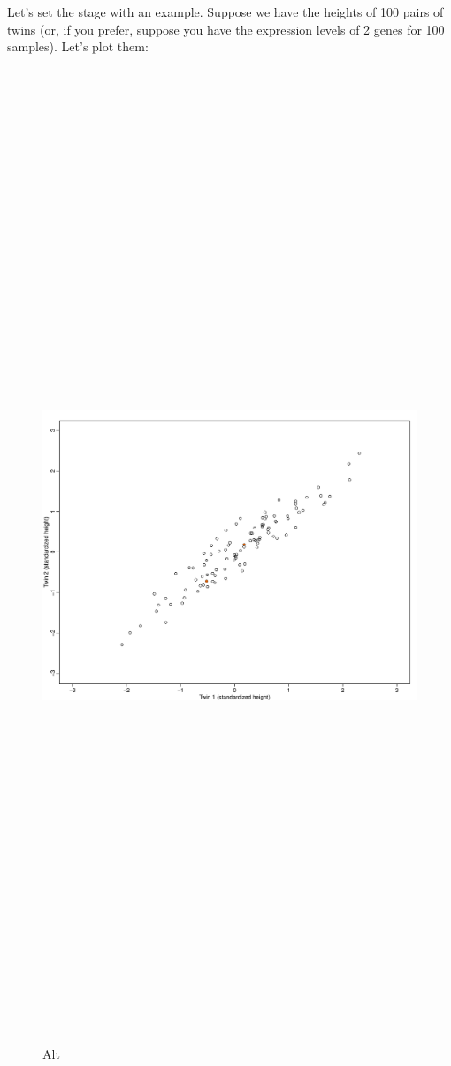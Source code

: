 \documentclass[
]{article}
\begin{document}
Let's set the stage with an example. Suppose we have the heights of 100
pairs of twins (or, if you prefer, suppose you have the expression
levels of 2 genes for 100 samples). Let's plot them:

\begin{figure}
\centering
\includegraphics[width=1\textwidth,height=12.5in]{Firstplot.pdf}
\caption{Alt}
\end{figure}
\end{document}
